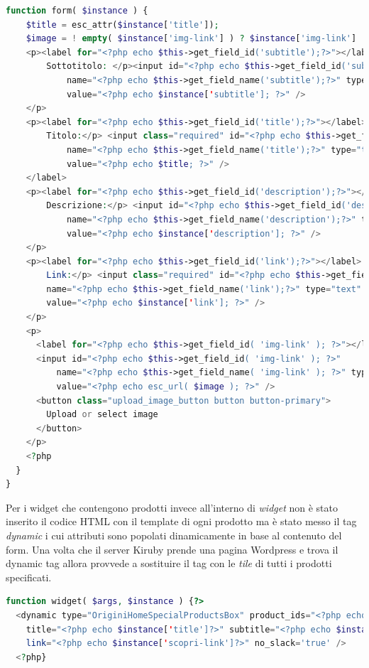 \begin{lstlisting}[style=customphp, basicstyle=\tiny, language=Php,caption={Codice del widget \emph{Origini - Speciale}}]
  function form( $instance ) {
    $title = esc_attr($instance['title']);
    $image = ! empty( $instance['img-link'] ) ? $instance['img-link'] : '';?>
    <p><label for="<?php echo $this->get_field_id('subtitle');?>"></label>
        Sottotitolo: </p><input id="<?php echo $this->get_field_id('subtitle');?>" 
        	name="<?php echo $this->get_field_name('subtitle');?>" type="text" 
        	value="<?php echo $instance['subtitle']; ?>" />
    </p>
    <p><label for="<?php echo $this->get_field_id('title');?>"></label>
        Titolo:</p> <input class="required" id="<?php echo $this->get_field_id('title');?>"
        	name="<?php echo $this->get_field_name('title');?>" type="text" 
        	value="<?php echo $title; ?>" />
    </label>
    <p><label for="<?php echo $this->get_field_id('description');?>"></label>
        Descrizione:</p> <input id="<?php echo $this->get_field_id('description');?>" 
        	name="<?php echo $this->get_field_name('description');?>" type="text" 
        	value="<?php echo $instance['description']; ?>" />
    </p>
    <p><label for="<?php echo $this->get_field_id('link');?>"></label>
        Link:</p> <input class="required" id="<?php echo $this->get_field_id('link');?>" 
        name="<?php echo $this->get_field_name('link');?>" type="text" 
        value="<?php echo $instance['link']; ?>" />
    </p>
    <p>
      <label for="<?php echo $this->get_field_id( 'img-link' ); ?>"></label>
      <input id="<?php echo $this->get_field_id( 'img-link' ); ?>" 
	      name="<?php echo $this->get_field_name( 'img-link' ); ?>" type="text" 
	      value="<?php echo esc_url( $image ); ?>" />
      <button class="upload_image_button button button-primary">
      	Upload or select image
      </button>
    </p>
    <?php
  }
}
\end{lstlisting}

Per i widget che contengono prodotti invece all'interno di \emph{widget} non è stato inserito il codice HTML con il template
di ogni prodotto ma è stato messo il tag \emph{dynamic} i cui attributi sono popolati dinamicamente in base al contenuto del form.
Una volta che il server Kiruby prende una pagina Wordpress e trova il dynamic tag allora provvede a sostituire il tag con le \emph{tile}
di tutti i prodotti specificati.

\begin{lstlisting}[style=customphp, basicstyle=\tiny, language=Php,caption={Il metodo \emph{widget} di \emph{Origini - Slider prodotti} stampa il dynamic tag che verrà letto da Kiruby e sostituito con l'HTML dei prodotti}] 
function widget( $args, $instance ) {?>
  <dynamic type="OriginiHomeSpecialProductsBox" product_ids="<?php echo $instance['ids']?>" 
    title="<?php echo $instance['title']?>" subtitle="<?php echo $instance['subtitle']?>" 
    link="<?php echo $instance['scopri-link']?>" no_slack='true' />
  <?php}
\end{lstlisting}\